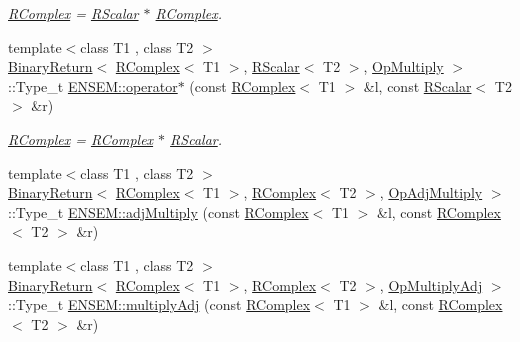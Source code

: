 \begin{DoxyCompactItemize}
\begin{DoxyCompactList}\small\item\em \mbox{\hyperlink{classENSEM_1_1RComplex}{R\+Complex}} = \mbox{\hyperlink{classENSEM_1_1RScalar}{R\+Scalar}} $\ast$ \mbox{\hyperlink{classENSEM_1_1RComplex}{R\+Complex}}. \end{DoxyCompactList}\item 
{\footnotesize template$<$class T1 , class T2 $>$ }\\\mbox{\hyperlink{structENSEM_1_1BinaryReturn}{Binary\+Return}}$<$ \mbox{\hyperlink{classENSEM_1_1RComplex}{R\+Complex}}$<$ T1 $>$, \mbox{\hyperlink{classENSEM_1_1RScalar}{R\+Scalar}}$<$ T2 $>$, \mbox{\hyperlink{structENSEM_1_1OpMultiply}{Op\+Multiply}} $>$\+::Type\+\_\+t \mbox{\hyperlink{group__rcomplex_gad99c4b787d010bff9c7b17d7c88e597a}{E\+N\+S\+E\+M\+::operator$\ast$}} (const \mbox{\hyperlink{classENSEM_1_1RComplex}{R\+Complex}}$<$ T1 $>$ \&l, const \mbox{\hyperlink{classENSEM_1_1RScalar}{R\+Scalar}}$<$ T2 $>$ \&r)
\begin{DoxyCompactList}\small\item\em \mbox{\hyperlink{classENSEM_1_1RComplex}{R\+Complex}} = \mbox{\hyperlink{classENSEM_1_1RComplex}{R\+Complex}} $\ast$ \mbox{\hyperlink{classENSEM_1_1RScalar}{R\+Scalar}}. \end{DoxyCompactList}\item 
{\footnotesize template$<$class T1 , class T2 $>$ }\\\mbox{\hyperlink{structENSEM_1_1BinaryReturn}{Binary\+Return}}$<$ \mbox{\hyperlink{classENSEM_1_1RComplex}{R\+Complex}}$<$ T1 $>$, \mbox{\hyperlink{classENSEM_1_1RComplex}{R\+Complex}}$<$ T2 $>$, \mbox{\hyperlink{structENSEM_1_1OpAdjMultiply}{Op\+Adj\+Multiply}} $>$\+::Type\+\_\+t \mbox{\hyperlink{group__rcomplex_ga0ee080478b142a857cd13cd07d2e17dd}{E\+N\+S\+E\+M\+::adj\+Multiply}} (const \mbox{\hyperlink{classENSEM_1_1RComplex}{R\+Complex}}$<$ T1 $>$ \&l, const \mbox{\hyperlink{classENSEM_1_1RComplex}{R\+Complex}}$<$ T2 $>$ \&r)
\item 
{\footnotesize template$<$class T1 , class T2 $>$ }\\\mbox{\hyperlink{structENSEM_1_1BinaryReturn}{Binary\+Return}}$<$ \mbox{\hyperlink{classENSEM_1_1RComplex}{R\+Complex}}$<$ T1 $>$, \mbox{\hyperlink{classENSEM_1_1RComplex}{R\+Complex}}$<$ T2 $>$, \mbox{\hyperlink{structENSEM_1_1OpMultiplyAdj}{Op\+Multiply\+Adj}} $>$\+::Type\+\_\+t \mbox{\hyperlink{group__rcomplex_ga7147ce299498e423c79851ee598dcde3}{E\+N\+S\+E\+M\+::multiply\+Adj}} (const \mbox{\hyperlink{classENSEM_1_1RComplex}{R\+Complex}}$<$ T1 $>$ \&l, const \mbox{\hyperlink{classENSEM_1_1RComplex}{R\+Complex}}$<$ T2 $>$ \&r)

\end{DoxyCompactItemize}
